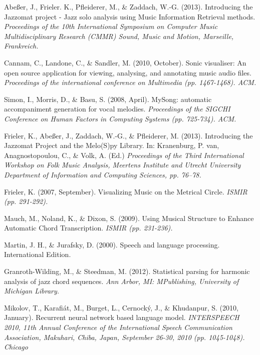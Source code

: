 \documentclass[bsc,singlespacing,parskip,deptreport,twoside,frontabs]{infthesis}
\begin{document}
\begin{thebibliography}{9}
 Abeßer, J., Frieler. K., Pfleiderer, M., \& Zaddach, W.-G. (2013). Introducing the Jazzomat project - Jazz solo analysis using Music Information Retrieval methods. \emph{Proceedings of the 10th International Symposium on Computer Music Multidisciplinary Research (CMMR) Sound, Music and Motion, Marseille, Frankreich.}

Cannam, C., Landone, C., \& Sandler, M. (2010, October). Sonic visualiser: An open source application for viewing, analysing, and annotating music audio files. \emph{Proceedings of the international conference on Multimedia (pp. 1467-1468). ACM.}

Simon, I., Morris, D., \& Basu, S. (2008, April). MySong: automatic accompaniment generation for vocal melodies. \emph{Proceedings of the SIGCHI Conference on Human Factors in Computing Systems (pp. 725-734). ACM.}

Frieler, K., Abeßer, J., Zaddach, W.-G., \& Pfleiderer, M. (2013). Introducing the Jazzomat Project and the Melo(S)py Library. In: Kranenburg, P. van, Anagnostopoulou, C., \& Volk, A. (Ed.) \emph{Proceedings of the Third International Workshop on Folk Music Analysis, Meertens Institute and Utrecht University Department of Information and Computing Sciences, pp. 76–78.}

Frieler, K. (2007, September). Visualizing Music on the Metrical Circle. \emph{ISMIR (pp. 291-292).}

Mauch, M., Noland, K., \& Dixon, S. (2009). Using Musical Structure to Enhance Automatic Chord Transcription. \emph{ISMIR (pp. 231-236).}

Martin, J. H., \& Jurafsky, D. (2000). Speech and language processing. International Edition.

Granroth-Wilding, M., \& Steedman, M. (2012). Statistical parsing for harmonic analysis of jazz chord sequences. \emph{Ann Arbor, MI: MPublishing, University of Michigan Library.}

Mikolov, T., Karafiát, M., Burget, L., Cernocký, J., \& Khudanpur, S. (2010, January). Recurrent neural network based language model. \emph{INTERSPEECH 2010, 11th Annual Conference of the International Speech Communication Association, Makuhari, Chiba, Japan, September 26-30, 2010 (pp. 1045-1048).
Chicago}


\end{thebibliography}
\end{document}
